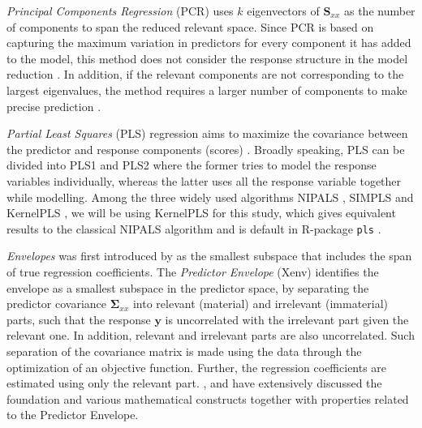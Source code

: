 \documentclass[12pt,3p,authoryear]{elsarticle}
\begin{document}
\emph{Principal Components Regression} (PCR) uses \(k\) eigenvectors of
\(\mathbf{S}_{xx}\) as the number of components to span the reduced
relevant space. Since PCR is based on capturing the maximum variation in
predictors for every component it has added to the model, this method
does not consider the response structure in the model reduction
\citep{Jolliffe2002}. In addition, if the relevant components are not
corresponding to the largest eigenvalues, the method requires a larger
number of components to make precise prediction \citep{Alm_y_1996}.

\emph{Partial Least Squares} (PLS) regression aims to maximize the
covariance between the predictor and response components (scores)
\citep{DeJong1993}. Broadly speaking, PLS can be divided into PLS1 and
PLS2 where the former tries to model the response variables
individually, whereas the latter uses all the response variable together
while modelling. Among the three widely used algorithms NIPALS
\citep{wold75nipals}, SIMPLS \citep{DeJong1993} and KernelPLS
\citep{Lindgren_1993}, we will be using KernelPLS for this study, which
gives equivalent results to the classical NIPALS algorithm and is
default in R-package \texttt{pls} \citep{mevik07_thepl}.

\emph{Envelopes} was first introduced by \citep{Cook2007a} as the
smallest subspace that includes the span of true regression
coefficients. The \emph{Predictor Envelope} (Xenv) identifies the
envelope as a smallest subspace in the predictor space, by separating
the predictor covariance \(\boldsymbol{\Sigma}_{xx}\) into relevant
(material) and irrelevant (immaterial) parts, such that the response
\(\mathbf{y}\) is uncorrelated with the irrelevant part given the
relevant one. In addition, relevant and irrelevant parts are also
uncorrelated. Such separation of the covariance matrix is made using the
data through the optimization of an objective function. Further, the
regression coefficients are estimated using only the relevant part.
\citet{cook2010envelope}, \citet{cook2013envelopes} and
\citet{cook2018envelope} have extensively discussed the foundation and
various mathematical constructs together with properties related to the
Predictor Envelope.
\end{document}
